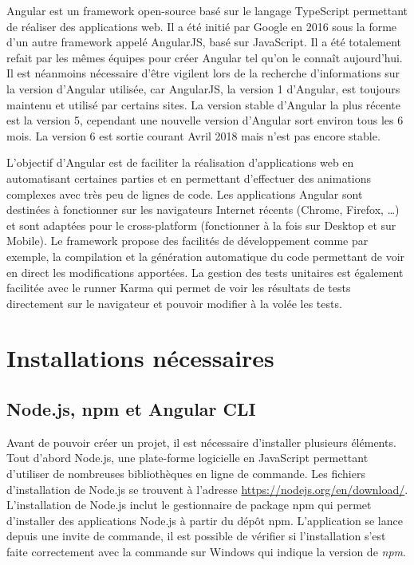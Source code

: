 \documentclass{polytech/polytech}
\begin{document}
Angular est un framework open-source basé sur le langage TypeScript permettant de réaliser des applications web. Il a été initié par Google en 2016 sous la forme d’un autre framework appelé AngularJS, basé sur JavaScript. Il a été totalement refait par les mêmes équipes pour créer Angular tel qu’on le connaît aujourd’hui. Il est néanmoins nécessaire d’être vigilent lors de la recherche d’informations sur la version d’Angular utilisée, car AngularJS, la version 1 d’Angular, est toujours maintenu et utilisé par certains sites. La version stable d’Angular la plus récente est la version 5, cependant une nouvelle version d’Angular sort environ tous les 6 mois. La version 6 est sortie courant Avril 2018 mais n’est pas encore stable.

L’objectif d’Angular est de faciliter la réalisation d’applications web en automatisant certaines parties et en permettant d’effectuer des animations complexes avec très peu de lignes de code. Les applications Angular sont destinées à fonctionner sur les navigateurs Internet récents (Chrome, Firefox, …) et sont adaptées pour le cross-platform (fonctionner à la fois sur Desktop et sur Mobile). Le framework propose des facilités de développement comme par exemple, la compilation et la génération automatique du code permettant de voir en direct les modifications apportées. La gestion des tests unitaires est également facilitée avec le runner Karma qui permet de voir les résultats de tests directement sur le navigateur et pouvoir modifier à la volée les tests.

\section{Installations nécessaires}

\subsection{Node.js, npm et Angular CLI}

Avant de pouvoir créer un projet, il est nécessaire d’installer plusieurs éléments. Tout d’abord Node.js, une plate-forme logicielle en JavaScript permettant d’utiliser de nombreuses bibliothèques en ligne de commande. Les fichiers d’installation de Node.js se trouvent à l’adresse \url{https://nodejs.org/en/download/}. L’installation de Node.js inclut le gestionnaire de package npm qui permet d’installer des applications Node.js à partir du dépôt npm. L’application se lance depuis une invite de commande, il est possible de vérifier si l’installation s’est faite correctement avec la commande  sur Windows qui indique la version de \textit{npm}. 
\end{document}
